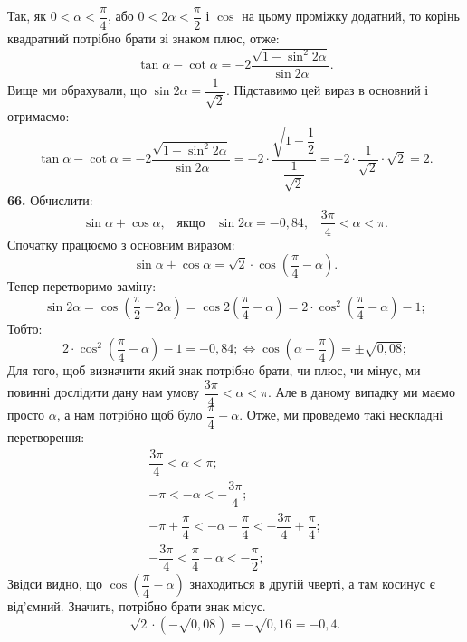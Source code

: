 Так, як $0<\alpha<\dfrac{\pi}{4}$, або $0<2\alpha<\dfrac{\pi}{2}$ і $\cos$ на цьому проміжку додатний, то корінь квадратний потрібно брати зі знаком плюс, отже:
$$
\tan\alpha-\cot\alpha=
-2\dfrac{\sqrt{1-\sin^2 2\alpha}}{\sin2\alpha}.
$$
Вище ми обрахували, що $\sin2\alpha=\dfrac{1}{\sqrt{2}}$. Підставимо цей вираз в основний і отримаємо:
$$
\tan\alpha-\cot\alpha=
-2\dfrac{\sqrt{1-\sin^2 2\alpha}}{\sin2\alpha}=
-2\cdot\dfrac{\sqrt{1-\dfrac{1}{2}}}{\dfrac{1}{\sqrt{2}}}=-2\cdot\dfrac{1}{\sqrt{2}}\cdot\sqrt{2}=2.
$$
\textbf{66.} Обчислити:
$$
\sin\alpha+\cos\alpha, \;\;\; \mbox{якщо} \;\;\; \sin2\alpha=-0,84, \;\;\; \dfrac{3\pi}{4}<\alpha<\pi.
$$
Спочатку працюємо з основним виразом:
$$
\sin\alpha+\cos\alpha=\sqrt{2}\cdot\cos\left(\dfrac{\pi}{4}-\alpha\right).
$$
Тепер перетворимо заміну:
$$
\sin2\alpha=\cos\left(\dfrac{\pi}{2}-2\alpha\right)=\cos2\left(\dfrac{\pi}{4}-\alpha\right)=
2\cdot\cos^2\left(\dfrac{\pi}{4}-\alpha\right)-1;
$$
Тобто:
$$
2\cdot\cos^2\left(\dfrac{\pi}{4}-\alpha\right)-1=-0,84;
\Leftrightarrow
\cos\left(\alpha-\dfrac{\pi}{4}\right)=\pm\sqrt{0,08};
$$
Для того, щоб визначити який знак потрібно брати, чи плюс, чи мінус, ми повинні дослідити дану нам умову $\dfrac{3\pi}{4}<\alpha<\pi$. Але в даному випадку ми маємо просто $\alpha$, а нам потрібно щоб було $\dfrac{\pi}{4}-\alpha$. Отже, ми проведемо такі нескладні перетворення:
\begin{gather*}
\dfrac{3\pi}{4}<\alpha<\pi;\\
-\pi<-\alpha<-\dfrac{3\pi}{4};\\
-\pi+\dfrac{\pi}{4}<-\alpha+\dfrac{\pi}{4}<-\dfrac{3\pi}{4}+\dfrac{\pi}{4};\\
-\dfrac{3\pi}{4}<\dfrac{\pi}{4}-\alpha<-\dfrac{\pi}{2};
\end{gather*}
Звідси видно, що $\cos\left(\dfrac{\pi}{4}-\alpha\right)$ знаходиться в другій чверті, а там косинус є від'ємний. Значить, потрібно брати знак місус.
$$
\sqrt{2}\cdot\left(-\sqrt{0,08}\right)=-\sqrt{0,16}=-0,4.
$$
